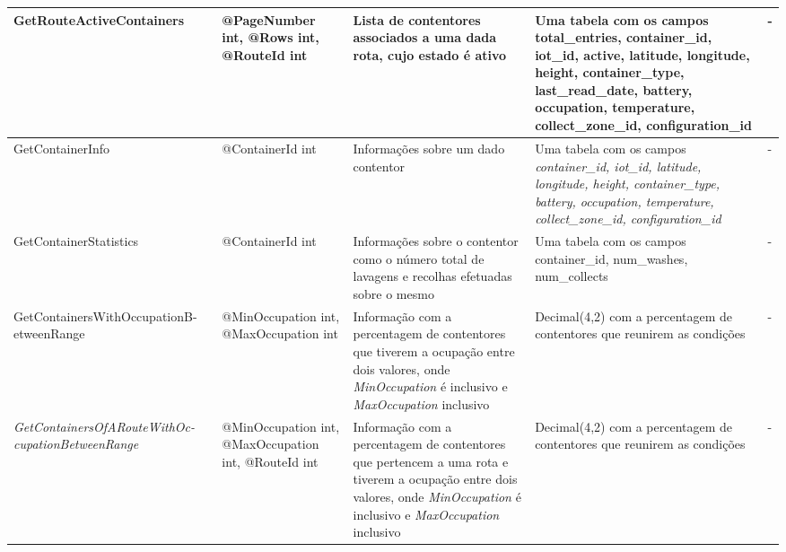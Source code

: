 \documentclass[10pt,a4paper,twoside]{report}
\begin{document}
\begin{longtable}{|>{\RaggedRight\arraybackslash}p{5cm}|>{\RaggedRight\arraybackslash}p{5cm}|>{\RaggedRight\arraybackslash}p{7cm}|>{\RaggedRight\arraybackslash}p{5cm}|>{\RaggedRight\arraybackslash}p{2cm}|}
		GetRouteActiveContainers & @PageNumber int,  @Rows int, @RouteId int & Lista de contentores associados a uma dada rota, cujo estado é ativo & Uma tabela com os campos total\_entries, container\_id, iot\_id, active, latitude, longitude, height, container\_type, last\_read\_date, battery, occupation, temperature, collect\_zone\_id, configuration\_id & - \\ \hline
		GetContainerInfo & @ContainerId int & Informações sobre um dado contentor & Uma tabela com os campos \textit{container\_id, iot\_id, latitude, longitude, height, container\_type, battery, occupation, temperature, collect\_zone\_id, configuration\_id} & - \\ \hline
		GetContainerStatistics & @ContainerId int & Informações sobre o contentor como o número total de lavagens e recolhas efetuadas sobre o mesmo & Uma tabela com os campos container\_id, num\_washes, num\_collects & - \\ \hline
		GetContainersWithOccupationB- etweenRange & @MinOccupation int, @MaxOccupation int & Informação com a percentagem de contentores que tiverem a ocupação entre dois valores, onde \textit{MinOccupation} é inclusivo e \textit{MaxOccupation} inclusivo & Decimal(4,2) com a percentagem de contentores que reunirem as condições & - \\ \hline
		\textit{GetContainersOfARouteWithOc- cupationBetweenRange}  & @MinOccupation int, @MaxOccupation int, @RouteId int & Informação com a percentagem de contentores que pertencem a uma rota e tiverem a ocupação entre dois valores, onde \textit{MinOccupation} é inclusivo e \textit{MaxOccupation} inclusivo & Decimal(4,2) com a percentagem de contentores que reunirem as condições & - \\ \hline
	\end{longtable}
	
\end{document}

